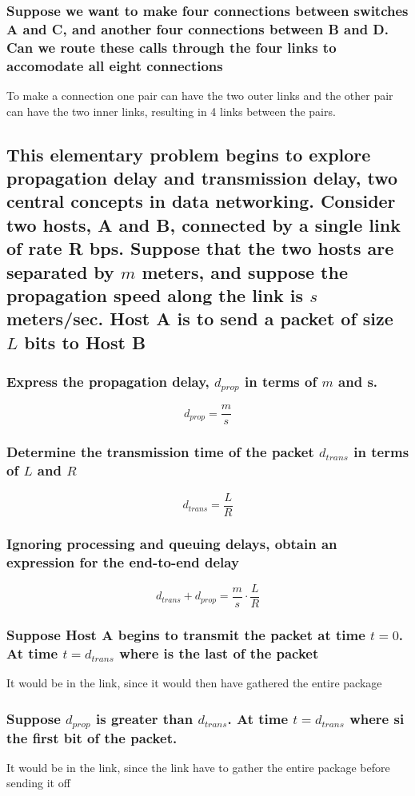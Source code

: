 \documentclass[12pt, a4paper]{article}
\begin{document}
			\subsubsection{Suppose we want to make four connections between switches A and C, and another four connections between B and D. Can we route these calls through the four links to accomodate all eight connections}
				To make a connection one pair can have the two outer links and the other pair can have the two inner links, resulting in 4 links between the pairs.
		\subsection{This elementary problem begins to explore propagation delay and transmission delay, two central concepts in data networking. Consider two hosts, A and B, connected by a single link of rate R bps. Suppose that the two hosts are separated by $m$ meters, and suppose the propagation speed along the link is $s$ meters/sec. Host A is to send a packet of size $L$ bits to Host B}
			\subsubsection{Express the propagation delay, $d_{prop}$ in terms of $m$ and s.}
				
				$$d_{prop} = \frac{m}{s}$$
			\subsubsection{Determine the transmission time of the packet $d_{trans}$ in terms of $L$ and $R$}
				$$d_{trans}=\frac{L}{R}$$
			\subsubsection{ Ignoring processing and queuing delays, obtain an expression for the end-to-end delay}
				$$d_{trans}+d_{prop}=\frac{m}{s}\cdot \frac{L}{R}$$
			\subsubsection{Suppose Host A begins to transmit the packet at time $t=0$. At time $t=d_{trans}$ where is the last of the packet}
				It would be in the link, since it would then have gathered the entire package
			\subsubsection{Suppose $d_{prop}$ is greater than $d_{trans}$. At time $t=d_{trans}$ where si the first bit of the packet.}
				It would be in the link, since the link have to gather the entire package before sending it off
\end{document}
